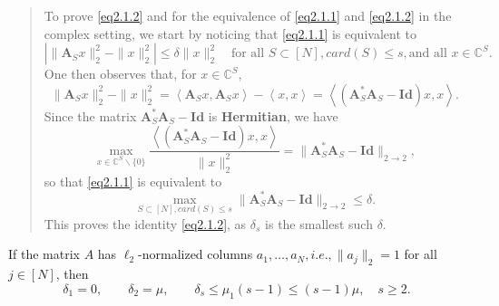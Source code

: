 \begin{quote}
    To prove \cref{eq2.1.2} and for the equivalence of \cref{eq2.1.1} and \cref{eq2.1.2} in the complex setting, we start by noticing that \cref{eq2.1.1} is equivalent to 
    \begin{equation*}
        \left|\|\mathbf{A}_S x\|_2^2 - \|x\|_2^2\right| \leq \delta \|x\|_2^2 \quad \text{for all } S \subset [N], card(S) \leq s, \text{and all } x \in \mathbb{C}^S.
    \end{equation*}
    One then observes that, for $x \in \mathbb{C}^S$,
    \begin{equation*}
        \|\mathbf{A}_S x\|_2^2 - \|x\|_2^2 = \left<\mathbf{A}_S x, \mathbf{A}_S x\right> - \left<x, x\right> = \left<\left(\mathbf{A}_S^* \mathbf{A}_S - \mathbf{Id}\right)x, x\right>.
    \end{equation*}
    Since the matrix $\mathbf{A}_S^* \mathbf{A}_S - \mathbf{Id}$ is \textbf{\textcolor[rgb]{1,0,0}{Hermitian}}, we have
    \begin{equation*}
        \max\limits_{x \in \mathbb{C}^S \backslash \{0\}} \dfrac{\left<(\mathbf{A}_S^* \mathbf{A}_S - \mathbf{Id})x,x\right>}{\|x\|_2^2} = \|\mathbf{A}_S^* \mathbf{A}_S - \mathbf{Id}\|_{2 \rightarrow 2},
    \end{equation*}
    so that \cref{eq2.1.1} is equivalent to 
    \begin{equation*}
        \max\limits_{S \subset [N], card(S) \leq s} \|\mathbf{A}_S^* \mathbf{A}_S - \mathbf{Id}\|_{2 \rightarrow 2} \leq \delta.
    \end{equation*}
    This proves the identity \cref{eq2.1.2}, as $\delta_s$ is the smallest such $\delta$.
\end{quote}

\begin{proposition}
    \label{pr2.2}
    If the matrix $A$ has $\ell_2$-normalized columns $a_1,\dots,a_N,i.e.,\|a_j\|_2=1$ for all $j \in [N]$, then
    \begin{equation*}
        \delta_1=0, \qquad \delta_2=\mu, \qquad \delta_s \leq \mu_1(s-1) \leq (s-1)\mu, \quad s \geq 2.
    \end{equation*}
\end{proposition}


